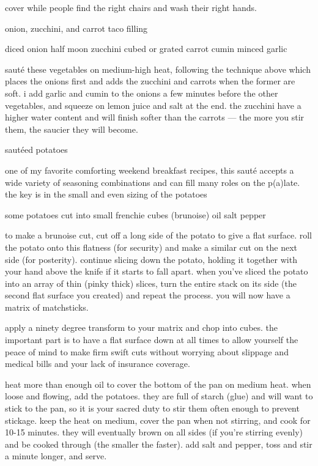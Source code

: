 cover while people find the right chairs and wash their right hands.

onion, zucchini, and carrot taco filling

diced onion
half moon zucchini
cubed or grated carrot
cumin
minced garlic

saut\'{e} these vegetables on medium-high heat, following the technique above which places the onions first and adds the zucchini and carrots when the former are soft. i add garlic and cumin to the onions a few minutes before the other vegetables, and squeeze on lemon juice and salt at the end. the zucchini have a higher water content and will finish softer than the carrots --- the more you stir them, the saucier they will become.

saut\'{e}ed potatoes

one of my favorite comforting weekend breakfast recipes, this saut\'{e} accepts a wide variety of seasoning combinations and can fill many roles on the p(a)late. the key is in the small and even sizing of the potatoes

some potatoes cut into small frenchie cubes (brunoise)
oil
salt
pepper

to make a brunoise cut, cut off a long side of the potato to give a flat surface. roll the potato onto this flatness (for security) and make a similar cut on the next side (for posterity). continue slicing down the potato, holding it together with your hand above the knife if it starts to fall apart. when you've sliced the potato into an array of thin (pinky thick) slices, turn the entire stack on its side (the second flat surface you created) and repeat the process. you will now have a matrix of matchsticks.

apply a ninety degree transform to your matrix and chop into cubes. the important part is to have a flat surface down at all times to allow yourself the peace of mind to make firm swift cuts without worrying about slippage and medical bills and your lack of insurance coverage.

heat more than enough oil to cover the bottom of the pan on medium heat. when loose and flowing, add the potatoes. they are full of starch (glue) and will want to stick to the pan, so it is your sacred duty to stir them often enough to prevent stickage. keep the heat on medium, cover the pan when not stirring, and cook for 10-15 minutes. they will eventually brown on all sides (if you're stirring evenly) and be cooked through (the smaller the faster). add salt and pepper, toss and stir a minute longer, and serve.

